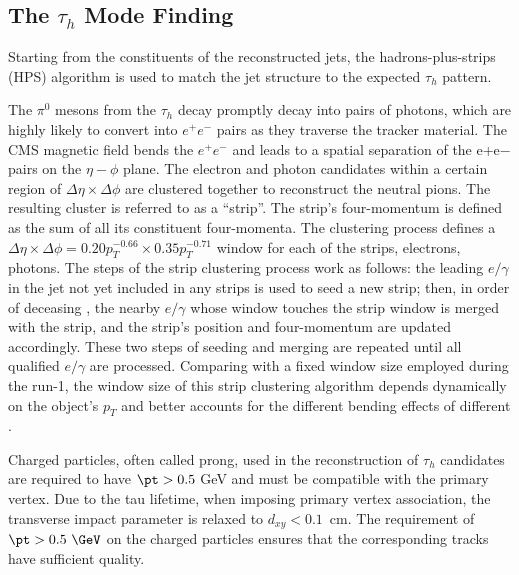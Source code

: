 \subsection{The $\tau_h$ Mode Finding}

Starting from the constituents of the reconstructed jets, the hadrons-plus-strips (HPS) algorithm is used to match the jet structure to the expected $\tau_h$ pattern. 

The $\pi^0$ mesons from the $\tau_h$ decay promptly decay into pairs of photons, which are highly likely to convert into $e^+e^-$ pairs as they traverse the tracker material. The CMS magnetic field bends the $e^+e^-$ and leads to a spatial separation of the e+e− pairs on the $\eta-\phi$ plane. The electron and photon candidates within a certain region of $\Delta\eta \times \Delta \phi$  are clustered together to reconstruct the neutral pions. The resulting cluster is referred to as a “strip”. The strip's four-momentum is defined as the sum of all its constituent four-momenta. The clustering process defines a $\Delta\eta \times \Delta \phi = 0.20p_T^{-0.66} \times 0.35 p_T^{-0.71}$ window for each of the strips, electrons, photons. The steps of the strip clustering process work as follows: the leading $e/\gamma$ in the jet not yet included in any strips is used to seed a new strip; then, in order of deceasing \pt, the nearby $e/\gamma$ whose window touches the strip window is merged with the strip, and the strip's position and four-momentum are updated accordingly. These two steps of seeding and merging are repeated until all qualified $e/\gamma$ are processed. Comparing with a fixed window size employed during the run-1, the window size of this strip clustering algorithm depends dynamically on the object's $p_T$ and better accounts for the different bending effects of different \pt.

Charged particles, often called prong, used in the reconstruction of $\tau_h$ candidates are required to have $\pt>0.5$ GeV and must be compatible with the primary vertex. Due to the tau lifetime, when imposing primary vertex association, the transverse impact parameter is relaxed to $d_{xy}<0.1$~cm. The requirement of $\pt > 0.5~\GeV$ on the charged particles ensures that the corresponding tracks have sufficient quality.

